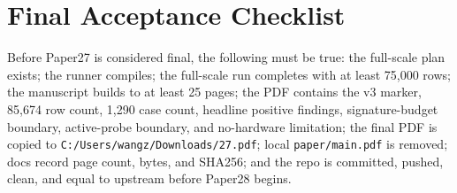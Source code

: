 \documentclass{article}
\begin{document}
\section{Final Acceptance Checklist}
Before Paper27 is considered final, the following must be true: the full-scale plan exists; the runner compiles; the full-scale run completes with at least 75,000 rows; the manuscript builds to at least 25 pages; the PDF contains the v3 marker, 85,674 row count, 1,290 case count, headline positive findings, signature-budget boundary, active-probe boundary, and no-hardware limitation; the final PDF is copied to \texttt{C:/Users/wangz/Downloads/27.pdf}; local \texttt{paper/main.pdf} is removed; docs record page count, bytes, and SHA256; and the repo is committed, pushed, clean, and equal to upstream before Paper28 begins.
\end{document}
